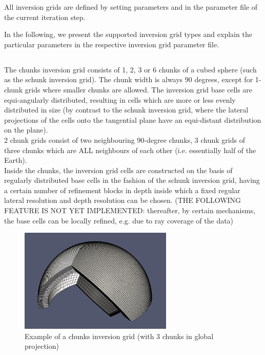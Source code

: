 All inversion grids are defined by setting parameters  and 
 in the parameter file of the current iteration step.

In the following, we present the supported inversion grid types and explain the particular
parameters in the respective inversion grid parameter file.
%
\subsection{} \label{basic_steps,sec:invgrid,sub:chunks}
%
The chunks inversion grid consists of 1, 2, 3 or 6 chunks of a cubed sphere (such as the 
schunk inversion grid). The chunk width is always 90 degrees, except for 1-chunk grids
where smaller chunks are allowed. The inversion grid base cells are equi-angularly distributed,
resulting in cells which are more or less evenly distributed in size (by contrast to the 
schunk inversion grid, where the lateral projections of the cells onto the tangential plane
have an equi-distant distribution on the plane).\\ 
2 chunk grids consist of two neighbouring 90-degree chunks, 3 chunk grids of three chunks 
which are ALL neighbours of each other (i.e. essentially half of the Earth).\\
Inside the chunks, the inversion grid cells are constructed on the basis of regularly distributed
base cells in the fashion of the schunk inversion grid, having a certain number of refinement
blocks in depth inside which a fixed regular lateral resolution and depth resolution can be chosen.
(THE FOLLOWING FEATURE IS NOT YET IMPLEMENTED: thereafter, by certain mechanisms, the base cells
can be locally refined, e.g. due to ray coverage of the data)

\begin{figure}[ht]
  \centering
  \includegraphics[width=0.65\textwidth]{images/chunksInversionGrid_manual.png}
  \caption{Example of a chunks inversion grid (with 3 chunks in global projection)}
  \label{basic_steps,sec:invgrid,sub:chunks,fig:grid}
\end{figure}

